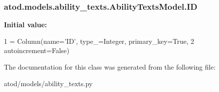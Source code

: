 \subsubsection[{\texorpdfstring{ID}{ID}}]{\setlength{\rightskip}{0pt plus 5cm}atod.\+models.\+ability\+\_\+texts.\+Ability\+Texts\+Model.\+ID\hspace{0.3cm}{\ttfamily [static]}}\hypertarget{classatod_1_1models_1_1ability__texts_1_1_ability_texts_model_a464cf4dba2a7e8fe3f9f5471622ab247}{}\label{classatod_1_1models_1_1ability__texts_1_1_ability_texts_model_a464cf4dba2a7e8fe3f9f5471622ab247}
{\bfseries Initial value\+:}
\begin{DoxyCode}
1 = Column(name=\textcolor{stringliteral}{'ID'}, type\_=Integer, primary\_key=\textcolor{keyword}{True},
2                          autoincrement=\textcolor{keyword}{False})
\end{DoxyCode}


The documentation for this class was generated from the following file\+:\begin{DoxyCompactItemize}
\item 
atod/models/ability\+\_\+texts.\+py\end{DoxyCompactItemize}

